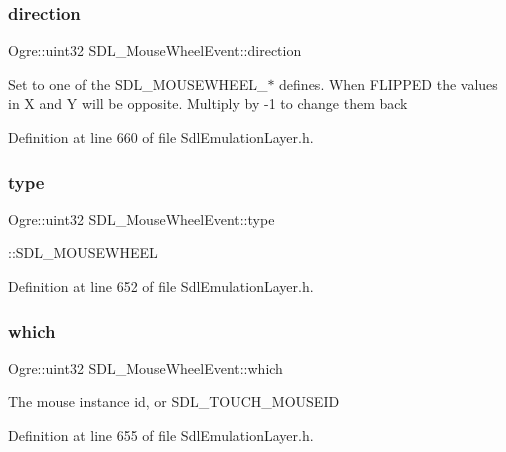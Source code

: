 \subsubsection{\texorpdfstring{direction}{direction}}
{\footnotesize\ttfamily Ogre\+::uint32 S\+D\+L\+\_\+\+Mouse\+Wheel\+Event\+::direction}

Set to one of the S\+D\+L\+\_\+\+M\+O\+U\+S\+E\+W\+H\+E\+E\+L\+\_\+$\ast$ defines. When F\+L\+I\+P\+P\+ED the values in X and Y will be opposite. Multiply by -\/1 to change them back 

Definition at line 660 of file Sdl\+Emulation\+Layer.\+h.

\mbox{\label{struct_s_d_l___mouse_wheel_event_af95b38618d3b8f1b22e6e0f600f02a39}} 
\subsubsection{\texorpdfstring{type}{type}}
{\footnotesize\ttfamily Ogre\+::uint32 S\+D\+L\+\_\+\+Mouse\+Wheel\+Event\+::type}

\+::\+S\+D\+L\+\_\+\+M\+O\+U\+S\+E\+W\+H\+E\+EL 

Definition at line 652 of file Sdl\+Emulation\+Layer.\+h.

\mbox{\label{struct_s_d_l___mouse_wheel_event_a34a577db46da6faff1cb26a1ee4ef5fb}} 
\subsubsection{\texorpdfstring{which}{which}}
{\footnotesize\ttfamily Ogre\+::uint32 S\+D\+L\+\_\+\+Mouse\+Wheel\+Event\+::which}

The mouse instance id, or S\+D\+L\+\_\+\+T\+O\+U\+C\+H\+\_\+\+M\+O\+U\+S\+E\+ID 

Definition at line 655 of file Sdl\+Emulation\+Layer.\+h.

\mbox{\label{struct_s_d_l___mouse_wheel_event_a80feacc82c79a2372dd1b6efd6003f65}} 
